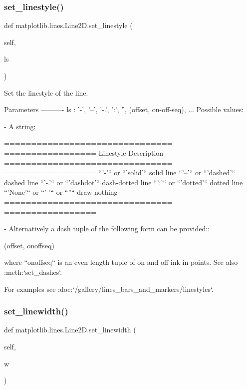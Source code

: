 \subsubsection{\texorpdfstring{set\+\_\+linestyle()}{set\_linestyle()}}
{\footnotesize\ttfamily def matplotlib.\+lines.\+Line2\+D.\+set\+\_\+linestyle (\begin{DoxyParamCaption}\item[{}]{self,  }\item[{}]{ls }\end{DoxyParamCaption})}

\begin{DoxyVerb}Set the linestyle of the line.

Parameters
----------
ls : {'-', '--', '-.', ':', '', (offset, on-off-seq), ...}
    Possible values:

    - A string:

      ===============================   =================
      Linestyle                         Description
      ===============================   =================
      ``'-'`` or ``'solid'``            solid line
      ``'--'`` or  ``'dashed'``         dashed line
      ``'-.'`` or  ``'dashdot'``        dash-dotted line
      ``':'`` or ``'dotted'``           dotted line
      ``'None'`` or ``' '`` or ``''``   draw nothing
      ===============================   =================

    - Alternatively a dash tuple of the following form can be
      provided::

  (offset, onoffseq)

      where ``onoffseq`` is an even length tuple of on and off ink
      in points. See also :meth:`set_dashes`.

    For examples see :doc:`/gallery/lines_bars_and_markers/linestyles`.
\end{DoxyVerb}
 \mbox{\label{classmatplotlib_1_1lines_1_1Line2D_ada4b6bcbe52d7dc7edba8b1d06ff3a97}} 
\subsubsection{\texorpdfstring{set\+\_\+linewidth()}{set\_linewidth()}}
{\footnotesize\ttfamily def matplotlib.\+lines.\+Line2\+D.\+set\+\_\+linewidth (\begin{DoxyParamCaption}\item[{}]{self,  }\item[{}]{w }\end{DoxyParamCaption})}

